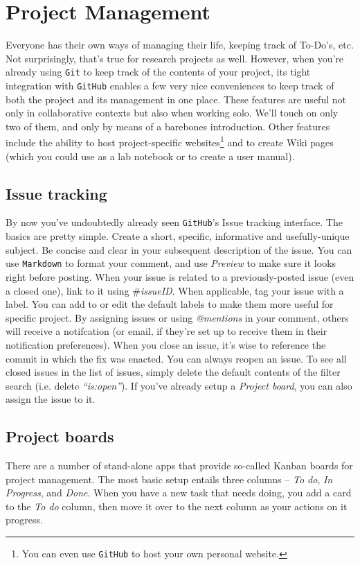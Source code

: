 \documentclass[12pt,letterpaper]{article}
\begin{document}
\section{Project Management}
Everyone has their own ways of managing their life, keeping track of To-Do's, etc.
Not surprisingly, that's true for research projects as well.
However, when you're already using \texttt{Git} to keep track of the contents of your project, its tight integration with \texttt{GitHub} enables a few very nice conveniences to keep track of both the project and its management in one place.
These features are useful not only in collaborative contexts but also when working solo.
We'll touch on only two of them, and only by means of a barebones introduction.
Other features include the ability to host project-specific websites\footnote{You can even use \texttt{GitHub} to host your own personal website.} and to create Wiki pages (which you could use as a lab notebook or to create a user manual).


\subsection{Issue tracking}
By now you've undoubtedly already seen \texttt{GitHub}'s Issue tracking interface.
The basics are pretty simple.
Create a short, specific, informative and usefully-unique subject.
Be concise and clear in your subsequent description of the issue.
You can use \texttt{Markdown} to format your comment, and use \emph{Preview} to make sure it looks right before posting.
When your issue is related to a previously-posted issue (even a closed one), link to it using \emph{$\#$issueID}.
When applicable, tag your issue with a label.
You can add to or edit the default labels to make them more useful for specific project.
By assigning issues or using \emph{@mentions} in your comment, others will receive a notifcation (or email, if they're set up to receive them in their notification preferences).
When you close an issue, it's wise to reference the commit in which the fix was enacted.
You can always reopen an issue.
To see all closed issues in the list of issues, simply delete the default contents of the filter search (i.e. delete \emph{``is:open''}).
If you've already setup a \emph{Project board}, you can also assign the issue to it.


\subsection{Project boards}
There are a number of stand-alone apps that provide so-called Kanban boards for project management.
The most basic setup entails three columns -- \emph{To do}, \emph{In Progress}, and \emph{Done}.
When you have a new task that needs doing, you add a card to the \emph{To do} column, then move it over to the next column as your actions on it progress.
\end{document}

